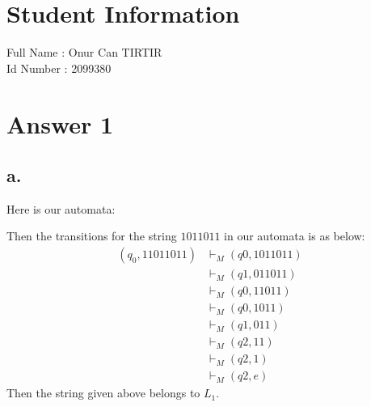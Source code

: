 \documentclass[12pt]{article}
\begin{document}
\section*{Student Information } 
Full Name :  Onur Can TIRTIR\\
Id Number :  2099380\\

\section*{Answer 1}

\subsection*{a.}
Here is our automata:
\begin{center}
\end{center}
Then the transitions for the string $1011011$ in our automata is as below:
\begin{align*}
	(q_0, 11011011) & \vdash_M (q0, 1011011) \\
				    & \vdash_M (q1, 011011) \\
				    & \vdash_M (q0, 11011) \\
				    & \vdash_M (q0, 1011) \\
				    & \vdash_M (q1, 011) \\
				    & \vdash_M (q2, 11) \\
				    & \vdash_M (q2, 1) \\
				    & \vdash_M (q2, e)
\end{align*}
Then the string given above belongs to $L_1$.
\end{document}
